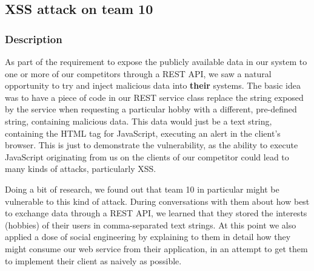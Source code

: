 \documentclass[a4paper]{article}
\begin{document}




\subsection{XSS attack on team 10}
\subsubsection{Description}
As part of the requirement to expose the publicly available data in our system to one or more of our competitors through a REST API, we saw a natural opportunity to try and inject malicious data into \textbf{their} systems. The basic idea was to have a piece of code in our REST service class replace the string exposed by the service when requesting a particular hobby with a different, pre-defined string, containing malicious data. This data would just be a text string, containing the HTML tag for JavaScript, executing an alert in the client's browser. This is just to demonstrate the vulnerability, as the ability to execute JavaScript originating from us on the clients of our competitor could lead to many kinds of attacks, particularly XSS.

Doing a bit of research, we found out that team 10 in particular might be vulnerable to this kind of attack. During conversations with them about how best to exchange data through a REST API, we learned that they stored the interests (hobbies) of their users in comma-separated text strings. At this point we also applied a dose of social engineering by explaining to them in detail how they might consume our web service from their application, in an attempt to get them to implement their client as naively as possible.
\end{document}

